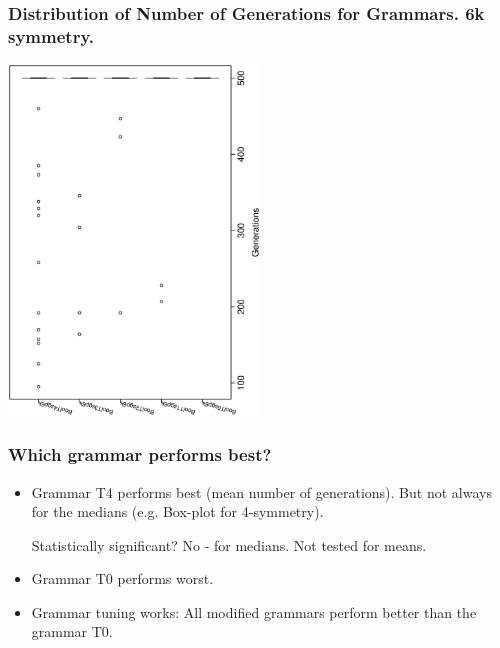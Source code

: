 \documentclass[18pt,c]{beamer}
\makeatletter
\let\beamer@writeslidentry@miniframeson=\beamer@writeslidentry
\newcommand*{\miniframeson}{\let\beamer@writeslidentry=\beamer@writeslidentry@miniframeson}
\makeatother
\begin{document}
 \begin{frame}
 \frametitle{ Distribution of Number of Generations for Grammars. 6k  symmetry. }
 \begin{center}
\includegraphics[width=0.5\textwidth, angle=-90]
{ExpBboxplottGenerations004.eps}
 \end{center}
 \label{ExpBboxplottGenerations004.eps}  
 \end{frame}

\begin{frame}
\frametitle{
Which grammar performs best?
}
\begin{itemize}
\item Grammar T4 performs best (mean number of generations).
  But not always for the medians (e.g. Box-plot for 4-symmetry).
 
Statistically significant? No - for medians. Not tested for means.
\item Grammar T0 performs worst.
\item Grammar tuning works:
 All modified grammars perform better than the grammar T0.
\end{itemize}
\end{frame}%
\miniframeson
\end{document}
